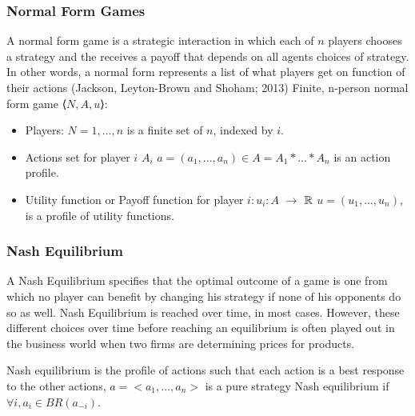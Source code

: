 \subsubsection{Normal Form Games}
A normal form game is a strategic interaction in which each of $n$ players chooses a strategy and the receives a payoff that depends on all agents choices of strategy. In other words, a normal form represents a list of what players get on function of their actions (Jackson, Leyton-Brown and Shoham; 2013)
Finite, n-person normal form game  ⟨$N, A, u$⟩:
\begin{itemize}
\item Players: $ N = {1, ... , n} $ is a finite set of $n$, indexed by $i$.
\item Actions set for player $i$ $A_i$
\subitem $a = (a_1,...,a_n) \in A = A_1 * ... * A_n $ is an action profile.
\item Utility function or Payoff function for player $i: u_i : A $  $\to$ ${\Bbb{R}}$
\subitem $u = (u_1,..., u_n)$, is a profile of utility functions.
\end{itemize}

\subsubsection{Nash Equilibrium}\label{subsection}
A Nash Equilibrium specifies that the optimal outcome of a game is one from which no player can benefit by changing his strategy if none of his opponents do so as well. Nash Equilibrium is reached  over time, in most cases. However, these different choices over time before reaching an equilibrium is often played out in the business world when two firms are determining prices for products.

\begin{mydef}\label{def:def1500}
Nash equilibrium is the profile of actions such that each action is a best response to the other actions,
$a = <a_1,...,a_n>$ is a pure strategy Nash equilibrium if $\forall i, a_i \in BR(a_{-i})$.
\end{mydef}


